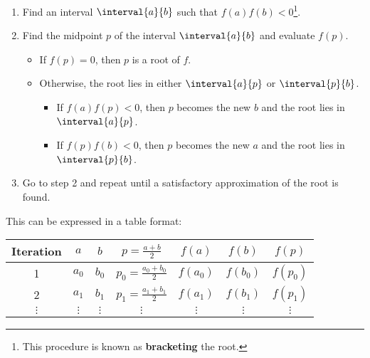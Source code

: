 \documentclass{article}
\begin{document}
\begin{enumerate}
    \item Find an interval \(\interval{a}{b}\) such that \(f\left( a \right) f\left( b \right) < 0\)\footnote{This procedure is known as \textbf{bracketing} the root.}.
    \item Find the midpoint \(p\) of the interval \(\interval{a}{b}\) and evaluate \(f\left( p \right)\).
          \begin{itemize}
              \item If \(f\left( p \right) = 0\), then \(p\) is a root of \(f\).
              \item Otherwise, the root lies in either \(\interval{a}{p}\) or \(\interval{p}{b}\).
                    \begin{itemize}
                        \item If \(f\left( a \right) f\left( p \right) < 0\), then \(p\) becomes the new \(b\) and the root lies in \(\interval{a}{p}\).
                        \item If \(f\left( p \right) f\left( b \right) < 0\), then \(p\) becomes the new \(a\) and the root lies in \(\interval{p}{b}\).
                    \end{itemize}
          \end{itemize}
    \item Go to step 2 and repeat until a satisfactory approximation of the root is found.
\end{enumerate}
This can be expressed in a table format:
\begin{table}[H]
    \centering
    \begin{tabular}{ccccccc}
        \toprule
        \textbf{Iteration} & \(a\)      & \(b\)      & \(p = \frac{a + b}{2}\)       & \(f\left( a \right)\)   & \(f\left( b \right)\)   & \(f\left( p \right)\)   \\
        \midrule
        1                  & \(a_0\)    & \(b_0\)    & \(p_0 = \frac{a_0 + b_0}{2}\) & \(f\left( a_0 \right)\) & \(f\left( b_0 \right)\) & \(f\left( p_0 \right)\) \\
        2                  & \(a_1\)    & \(b_1\)    & \(p_1 = \frac{a_1 + b_1}{2}\) & \(f\left( a_1 \right)\) & \(f\left( b_1 \right)\) & \(f\left( p_1 \right)\) \\
        \(\vdots\)         & \(\vdots\) & \(\vdots\) & \(\vdots\)                    & \(\vdots\)              & \(\vdots\)              & \(\vdots\)              \\
        \bottomrule
    \end{tabular}
\end{table}
\end{document}
